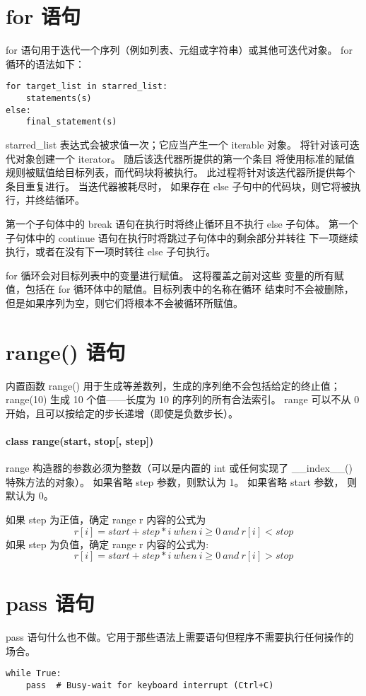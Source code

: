 \documentclass[a4paper, 12pt]{article}
\begin{document}
\section{for 语句}
for 语句用于迭代一个序列（例如列表、元组或字符串）或其他可迭代对象。
for 循环的语法如下：\par
\begin{listing}[h!]
\begin{verbatim}
for target_list in starred_list:
    statements(s)
else:
    final_statement(s)
\end{verbatim}
\end{listing}
starred\_list 表达式会被求值一次；它应当产生一个 iterable 对象。 
将针对该可迭代对象创建一个 iterator。 随后该迭代器所提供的第一个条目
将使用标准的赋值规则被赋值给目标列表，而代码块将被执行。 
此过程将针对该迭代器所提供每个条目重复进行。 当迭代器被耗尽时，
如果存在 else 子句中的代码块，则它将被执行，并终结循环。\par
第一个子句体中的 break 语句在执行时将终止循环且不执行 else 子句体。 
第一个子句体中的 continue 语句在执行时将跳过子句体中的剩余部分并转往
下一项继续执行，或者在没有下一项时转往 else 子句执行。\par

for 循环会对目标列表中的变量进行赋值。 这将覆盖之前对这些
变量的所有赋值，包括在 for 循环体中的赋值。目标列表中的名称在循环
结束时不会被删除，但是如果序列为空，则它们将根本不会被循环所赋值。\par

\section{range() 语句}
内置函数 range() 用于生成等差数列，生成的序列绝不会包括给定的终止值；
range(10) 生成 10 个值——长度为 10 的序列的所有合法索引。
range 可以不从 0 开始，且可以按给定的步长递增（即使是负数步长）。\par
\paragraph{class range(start, stop[, step])}
range 构造器的参数必须为整数（可以是内置的 int 或任何实现了 \_\_index\_\_() 
特殊方法的对象）。 如果省略 step 参数，则默认为 1。 如果省略 start 参数，
则默认为 0。\par
如果 step 为正值，确定 range r 内容的公式为
\[
    r[i] = start + step*i \ when\ i \geq 0 \ and\ r[i] < stop
\]
如果 step 为负值，确定 range r 内容的公式为:
\[
    r[i] = start + step*i \ when\ i \geq 0 \ and\ r[i] > stop
\]
\section{pass 语句}
pass 语句什么也不做。它用于那些语法上需要语句但程序不需要执行任何操作的场合。
\begin{listing}[h!]
\begin{verbatim}
while True:
    pass  # Busy-wait for keyboard interrupt (Ctrl+C)
\end{verbatim}
\end{listing}
\end{document}
